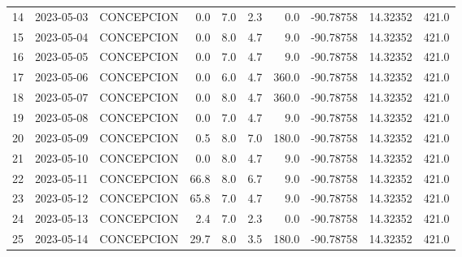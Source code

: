 \documentclass[12pt]{article}
\begin{document}
\begin{center}
\begin{tabular}{lllrrrrrrr}
14  & 2023-05-03 &  CONCEPCION &     0.0 &  7.0 &         2.3 &         0.0 & -90.78758 &  14.32352 &    421.0 \\
15  & 2023-05-04 &  CONCEPCION &     0.0 &  8.0 &         4.7 &         9.0 & -90.78758 &  14.32352 &    421.0 \\
16  & 2023-05-05 &  CONCEPCION &     0.0 &  7.0 &         4.7 &         9.0 & -90.78758 &  14.32352 &    421.0 \\
17  & 2023-05-06 &  CONCEPCION &     0.0 &  6.0 &         4.7 &       360.0 & -90.78758 &  14.32352 &    421.0 \\
18  & 2023-05-07 &  CONCEPCION &     0.0 &  8.0 &         4.7 &       360.0 & -90.78758 &  14.32352 &    421.0 \\
19  & 2023-05-08 &  CONCEPCION &     0.0 &  7.0 &         4.7 &         9.0 & -90.78758 &  14.32352 &    421.0 \\
20  & 2023-05-09 &  CONCEPCION &     0.5 &  8.0 &         7.0 &       180.0 & -90.78758 &  14.32352 &    421.0 \\
21  & 2023-05-10 &  CONCEPCION &     0.0 &  8.0 &         4.7 &         9.0 & -90.78758 &  14.32352 &    421.0 \\
22  & 2023-05-11 &  CONCEPCION &    66.8 &  8.0 &         6.7 &         9.0 & -90.78758 &  14.32352 &    421.0 \\
23  & 2023-05-12 &  CONCEPCION &    65.8 &  7.0 &         4.7 &         9.0 & -90.78758 &  14.32352 &    421.0 \\
24  & 2023-05-13 &  CONCEPCION &     2.4 &  7.0 &         2.3 &         0.0 & -90.78758 &  14.32352 &    421.0 \\
25  & 2023-05-14 &  CONCEPCION &    29.7 &  8.0 &         3.5 &       180.0 & -90.78758 &  14.32352 &    421.0 \\
\bottomrule
\end{tabular}

        
        \end{center}
        
\end{document}
